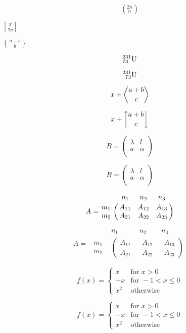 \documentclass[11pt]{article}
\begin{document}
$$(_{\ n\,}^{2n})$$

$x \brack 2y$

$a-c \brace b$

$${}_{ 73}^{231}{\rm U}$$

$${}_{\phantom{0}73}^{231}{\rm U}$$

$$x+{a+b \atopwithdelims<> c}$$

$$x+{a+b \atopwithdelims\uparrow\downarrow c}$$


$$B = 
\begin{pmatrix}
\lambda & l \\
a & \alpha \\
\end{pmatrix}$$

$$B=\left(
\begin{array}{cc}
\lambda & l \\
a & \alpha \\
\end{array}
\right)$$

$$A=\bordermatrix{& n_1 & n_2 & n_3 \cr
m_1 & A_{11} & A_{12} & A_{13} \cr
m_2 & A_{21} & A_{22} & A_{23} \cr}$$

\[
A = 
\begin{array}{cccc}
& n_1 & n_2 & n_3 \\
\begin{array}{c} m_1 \\ m_2 \end{array} &
\left(
\begin{array}{c} A_{11} \\ A_{21} \end{array} \right. &
\begin{array}{c} A_{12} \\ A_{22} \end{array} &
\left. \begin{array}{c} A_{13} \\ A_{23} \end{array}\right)
\end{array}
\]

$$f(x)= \left\{
\begin{array}{ll} 
x & \mbox{for } x>0 \\
-x & \mbox{for } -1<x \leq 0 \\
x^2 & \mbox{otherwise} 
\end{array}
\right.$$

$$f(x)= \left\{
\begin{array}{rl} 
x & \mbox{for } x>0 \\
-x & \mbox{for } -1<x \leq 0 \\
x^2 & \mbox{otherwise} 
\end{array}
\right.$$
\end{document}
